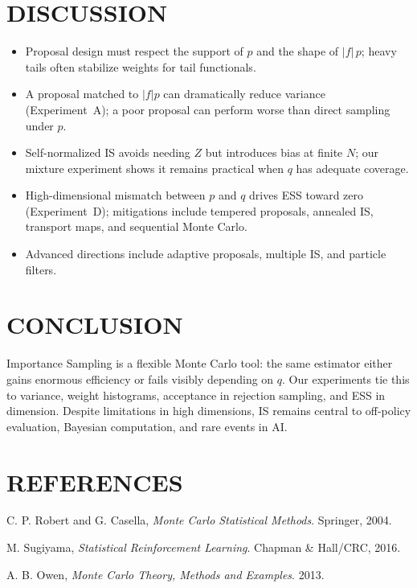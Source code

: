 \documentclass[10pt,a4paper,conference]{IEEEtran}
\begin{document}
\section{DISCUSSION}
\begin{itemize}[noitemsep]
    \item Proposal design must respect the support of \(p\) and the shape of \(|f|\,p\); heavy tails often stabilize weights for tail functionals.
    \item A proposal matched to \(|f|p\) can dramatically reduce variance (Experiment~A); a poor proposal can perform worse than direct sampling under \(p\).
    \item Self-normalized IS avoids needing \(Z\) but introduces bias at finite \(N\); our mixture experiment shows it remains practical when \(q\) has adequate coverage.
    \item High-dimensional mismatch between \(p\) and \(q\) drives ESS toward zero (Experiment~D); mitigations include tempered proposals, annealed IS, transport maps, and sequential Monte Carlo.
    \item Advanced directions include adaptive proposals, multiple IS, and particle filters.
\end{itemize}

\section{CONCLUSION}
Importance Sampling is a flexible Monte Carlo tool: the same estimator either gains enormous efficiency or fails visibly depending on \(q\). Our experiments tie this to variance, weight histograms, acceptance in rejection sampling, and ESS in dimension. Despite limitations in high dimensions, IS remains central to off-policy evaluation, Bayesian computation, and rare events in AI.

\section{REFERENCES}
\begin{enumerate}[label={[\arabic*]}]
    \item C. P. Robert and G. Casella, \emph{Monte Carlo Statistical Methods}. Springer, 2004.
    \item M. Sugiyama, \emph{Statistical Reinforcement Learning}. Chapman \& Hall/CRC, 2016.
    \item A. B. Owen, \emph{Monte Carlo Theory, Methods and Examples}. 2013.
\end{enumerate}
\end{document}
